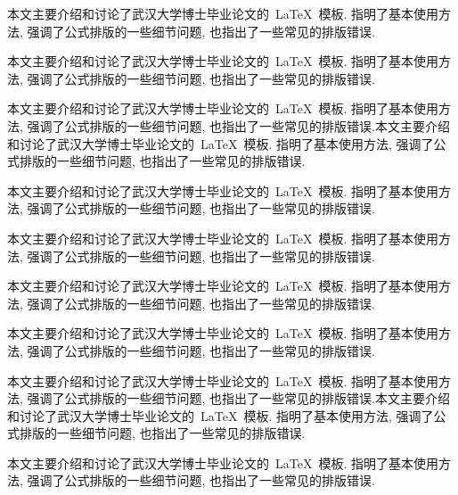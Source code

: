 
%

\begin{cnabstract}
本文主要介绍和讨论了武汉大学博士毕业论文的~\LaTeX~模板.
指明了基本使用方法, 强调了公式排版的一些细节问题, 也指出了一些常见的排版错误.

本文主要介绍和讨论了武汉大学博士毕业论文的~\LaTeX~模板.
指明了基本使用方法, 强调了公式排版的一些细节问题, 也指出了一些常见的排版错误.

本文主要介绍和讨论了武汉大学博士毕业论文的~\LaTeX~模板.
指明了基本使用方法, 强调了公式排版的一些细节问题, 也指出了一些常见的排版错误.本文主要介绍和讨论了武汉大学博士毕业论文的~\LaTeX~模板.
指明了基本使用方法, 强调了公式排版的一些细节问题, 也指出了一些常见的排版错误.

本文主要介绍和讨论了武汉大学博士毕业论文的~\LaTeX~模板.
指明了基本使用方法, 强调了公式排版的一些细节问题, 也指出了一些常见的排版错误.

本文主要介绍和讨论了武汉大学博士毕业论文的~\LaTeX~模板.
指明了基本使用方法, 强调了公式排版的一些细节问题, 也指出了一些常见的排版错误.

本文主要介绍和讨论了武汉大学博士毕业论文的~\LaTeX~模板.
指明了基本使用方法, 强调了公式排版的一些细节问题, 也指出了一些常见的排版错误.

本文主要介绍和讨论了武汉大学博士毕业论文的~\LaTeX~模板.
指明了基本使用方法, 强调了公式排版的一些细节问题, 也指出了一些常见的排版错误.

本文主要介绍和讨论了武汉大学博士毕业论文的~\LaTeX~模板.
指明了基本使用方法, 强调了公式排版的一些细节问题, 也指出了一些常见的排版错误.本文主要介绍和讨论了武汉大学博士毕业论文的~\LaTeX~模板.
指明了基本使用方法, 强调了公式排版的一些细节问题, 也指出了一些常见的排版错误.


本文主要介绍和讨论了武汉大学博士毕业论文的~\LaTeX~模板.
指明了基本使用方法, 强调了公式排版的一些细节问题, 也指出了一些常见的排版错误.


\end{cnabstract}
